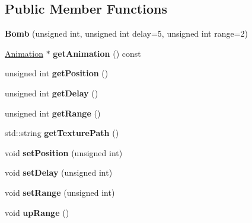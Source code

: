 \subsection*{Public Member Functions}
\begin{DoxyCompactItemize}
\item 
\hypertarget{class_bomb_a34c9e23f073db9d1a426a3e02b267bb2}{}{\bfseries Bomb} (unsigned int, unsigned int delay=5, unsigned int range=2)\label{class_bomb_a34c9e23f073db9d1a426a3e02b267bb2}

\item 
\hypertarget{class_bomb_a36e00f087ceea86c1d17f1176cd181df}{}\hyperlink{class_animation}{Animation} $\ast$ {\bfseries get\+Animation} () const \label{class_bomb_a36e00f087ceea86c1d17f1176cd181df}

\item 
\hypertarget{class_bomb_a71e20ea7a83e0b2f53c49ccb05e9c610}{}unsigned int {\bfseries get\+Position} ()\label{class_bomb_a71e20ea7a83e0b2f53c49ccb05e9c610}

\item 
\hypertarget{class_bomb_a4122798d970f59e9fef19a5ca9b33585}{}unsigned int {\bfseries get\+Delay} ()\label{class_bomb_a4122798d970f59e9fef19a5ca9b33585}

\item 
\hypertarget{class_bomb_a139c1aeef8a7ba07619699c4f0710b30}{}unsigned int {\bfseries get\+Range} ()\label{class_bomb_a139c1aeef8a7ba07619699c4f0710b30}

\item 
\hypertarget{class_bomb_acb2bd3f88e30d3574c8d64966fd50ba1}{}std\+::string {\bfseries get\+Texture\+Path} ()\label{class_bomb_acb2bd3f88e30d3574c8d64966fd50ba1}

\item 
\hypertarget{class_bomb_a3e3b4911858674cd29206b77b9a38040}{}void {\bfseries set\+Position} (unsigned int)\label{class_bomb_a3e3b4911858674cd29206b77b9a38040}

\item 
\hypertarget{class_bomb_afdf667f8b30b637b09f0fa22f96e7dce}{}void {\bfseries set\+Delay} (unsigned int)\label{class_bomb_afdf667f8b30b637b09f0fa22f96e7dce}

\item 
\hypertarget{class_bomb_ae0f147b7917e3bcfe94449bf8b424ca3}{}void {\bfseries set\+Range} (unsigned int)\label{class_bomb_ae0f147b7917e3bcfe94449bf8b424ca3}

\item 
\hypertarget{class_bomb_a783a03faa437f0dad7e90bf97edb9eb5}{}void {\bfseries up\+Range} ()\label{class_bomb_a783a03faa437f0dad7e90bf97edb9eb5}


\end{DoxyCompactItemize}

